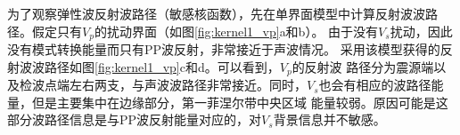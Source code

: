 为了观察弹性波反射波路径（敏感核函数），先在单界面模型中计算反射波波路径。假定只有$V_p$的扰动界面（如图\ref{fig:kernel1_vp}a和b）。
由于没有$V_s$扰动，因此没有模式转换能量而只有PP波反射，非常接近于声波情况。
采用该模型获得的反射波波路径如图\ref{fig:kernel1_vp}c和d。可以看到，$V_p$的反射波
路径分为震源端以及检波点端左右两支，与声波波路径非常接近。同时，$V_s$也会有相应的波路径能量，但是主要集中在边缘部分，第一菲涅尔带中央区域
能量较弱。原因可能是这部分波路径信息是与PP波反射能量对应的，对$V_s$背景信息并不敏感。
